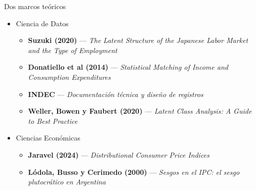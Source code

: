 \documentclass{beamer}
\begin{document}
\begin{frame}{Dos marcos teóricos}
    \begin{itemize}
        \item Ciencia de Datos
        \begin{itemize}
            \item \textbf{Suzuki (2020)} --- \textit{The Latent Structure of the Japanese Labor Market and the Type of Employment}
                \vspace{0.4em}
            \item \textbf{Donatiello et al (2014)} --- \textit{Statistical Matching of Income and Consumption Expenditures}
                \vspace{0.4em}
            \item \textbf{INDEC} --- \textit{Documentación técnica y diseño de registros}
                \vspace{0.4em}
            \item \textbf{Weller, Bowen y Faubert (2020)} --- \textit{Latent Class Analysis: A Guide to Best Practice}
                \vspace{0.8em}
        \end{itemize}
        \item Ciencias Económicas
        \begin{itemize}
            \item \textbf{Jaravel (2024)} --- \textit{Distributional Consumer Price Indices}
              \vspace{0.4em}
            \item \textbf{Lódola, Busso y Cerimedo (2000)} --- \textit{Sesgos en el IPC: el sesgo plutocrático en Argentina}
        \end{itemize}
    \end{itemize}
\end{frame}
\end{document}
